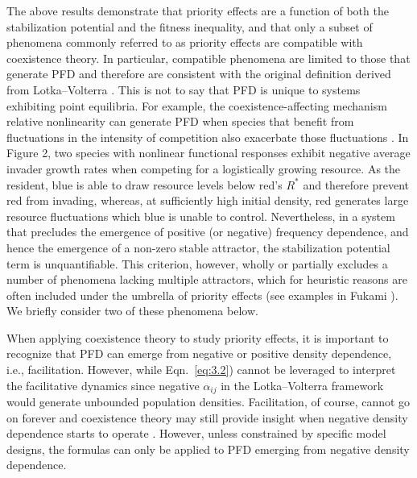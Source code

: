 The above results demonstrate that priority effects are a function of both the stabilization potential and the fitness inequality, and that only a subset of phenomena commonly referred to as priority effects are compatible with coexistence theory. In particular, compatible phenomena are limited to those that generate PFD and therefore are consistent with the original definition derived from Lotka--Volterra \citep{Petraitis2013}. This is not to say that PFD is unique to systems exhibiting point equilibria. For example, the coexistence-affecting mechanism relative nonlinearity can generate PFD when species that benefit from fluctuations in the intensity of competition also exacerbate those fluctuations \citep{Chesson2009}. In Figure 2, two species with nonlinear functional responses exhibit negative average invader growth rates when competing for a logistically growing resource. As the resident, blue is able to draw resource levels below red's $R^*$ and therefore prevent red from invading, whereas, at sufficiently high initial density, red generates large resource fluctuations which blue is unable to control. Nevertheless, in a system that precludes the emergence of positive (or negative) frequency dependence, and hence the emergence of a non-zero stable attractor, the stabilization potential term is unquantifiable. This criterion, however, wholly or partially excludes a number of phenomena lacking multiple attractors, which for heuristic reasons are often included under the umbrella of priority effects (see examples in Fukami \cite{Fukami2015}). We briefly consider two of these phenomena below. 
\par


When applying coexistence theory to study priority effects, it is important to recognize that PFD can emerge from negative or positive density dependence, i.e., facilitation. However, while Eqn.~\ref{eq:3.2}) cannot be leveraged to interpret the facilitative dynamics since negative $\alpha_{ij}$ in the Lotka--Volterra framework would generate unbounded population densities. Facilitation, of course, cannot go on forever and coexistence theory may still provide insight when negative density dependence starts to operate \citep{Schreiber2017}. However, unless constrained by specific model designs, the formulas can only be applied to PFD emerging from negative density dependence. 
\par


